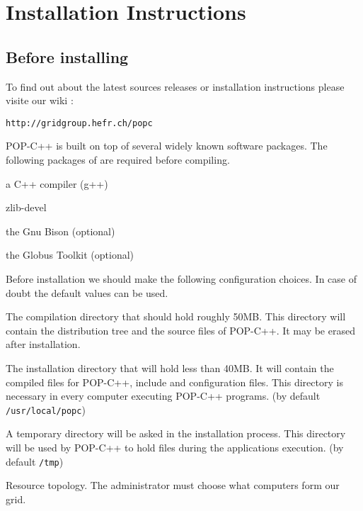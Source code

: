 \chapter{Installation Instructions}

\section{Before installing}

To find out about the latest sources releases or installation instructions please visite our wiki :

\texttt{http://gridgroup.hefr.ch/popc}

POP-C++ is built on top of several widely known software packages. The following packages 
of are required before compiling.

\begin{petitem}

\item a C++ compiler (g++)

\item zlib-devel

\item the Gnu Bison (optional)

\item the Globus Toolkit (optional)
\end{petitem}

Before installation we should make the following configuration choices. 
In case of doubt the default values can be used.

\begin{petitem}

\item The compilation directory that should hold roughly 50MB. This
directory will contain the distribution tree and the source files of
POP-C++. It may be erased after installation.

\item The installation directory that will hold less than 40MB. It will
contain the compiled files for POP-C++, include and configuration files.
This directory is necessary in every computer executing POP-C++
programs. (by default \texttt{/usr/local/popc})

\item A temporary directory will be asked in the installation process.
This directory will be used by POP-C++ to hold files during the
applications execution. (by default \texttt{/tmp})

\item Resource topology. The administrator must choose what computers form our grid.
\end{petitem}

